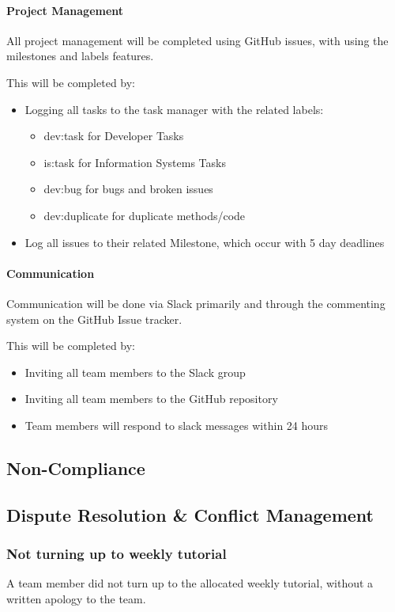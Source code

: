 \documentclass[12pt, a4paper, onecolumn]{article}
\begin{document}
\paragraph{Project Management}
All project management will be completed using GitHub issues, with
using the milestones and labels features.

This will be completed by:
\begin{itemize}
  \setlength\itemsep{1px}
  \item Logging all tasks to the task manager with the related labels:
  \begin{itemize}
    \setlength\itemsep{1px}
    \item dev:task for Developer Tasks
    \item is:task for Information Systems Tasks
    \item dev:bug for bugs and broken issues
    \item dev:duplicate for duplicate methods/code
  \end{itemize}
  \item Log all issues to their related Milestone, which occur
  with 5 day deadlines
\end{itemize}

\paragraph{Communication}
Communication will be done via Slack primarily and through the
commenting system on the GitHub Issue tracker.

This will be completed by:
\begin{itemize}
  \setlength\itemsep{1px}
  \item Inviting all team members to the Slack group
  \item Inviting all team members to the GitHub repository
  \item Team members will respond to slack messages within 24 hours
\end{itemize}

\subsection{Non-Compliance}


\subsection{Dispute Resolution \& Conflict Management}

\subsubsection{Not turning up to weekly tutorial}
A team member did not turn up to the allocated weekly tutorial, without
a written apology to the team.
\end{document}
